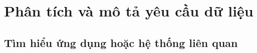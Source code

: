 \section{Phân tích và mô tả yêu cầu dữ liệu}
\subsection{Tìm hiểu ứng dụng hoặc hệ thống liên quan}
